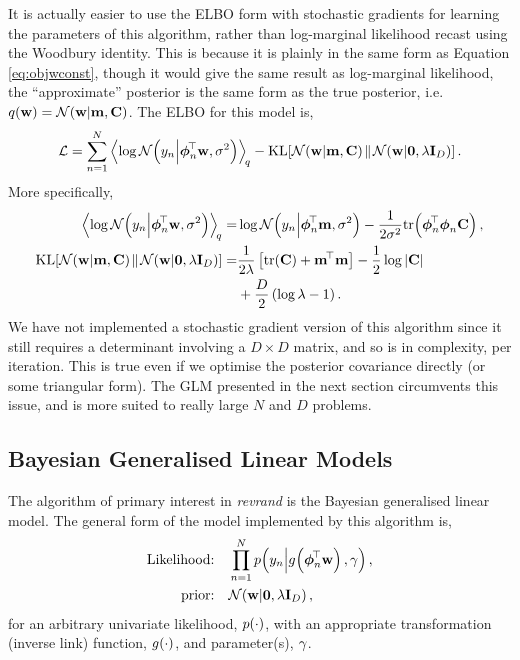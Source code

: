 \documentclass[11pt, oneside]{article}
\begin{document}
It is actually easier to use the ELBO form with stochastic gradients for
learning the parameters of this algorithm, rather than log-marginal likelihood
recast using the Woodbury identity.  This is because it is plainly in the same
form as Equation \eqref{eq:objwconst}, though it would give the same result as
log-marginal likelihood, the ``approximate'' posterior is the same form as the
true posterior, i.e.\ $q\!\left({\mathbf{w}}\right) = \mathcal{N}\!\left({\mathbf{w}}\middle\vert{\ensuremath{\mathbf{m}}, \ensuremath{\mathbf{C}}}\right)$.
The ELBO for this model is,
\begin{equation}
    \elbo = \sum^N_{n=1} 
    \expec{q}{\log\gausC{\targs_n}{\feats_n\T\weights, \var}}
    - \KL{\gausC{\weights}{\pomean, \pocov}}
        {\gausC{\weights}{\mathbf{0}, \reg\ident{D}}}.
    \label{eq:slmobj}
\end{equation}
More specifically,
\begin{align*}
    \expec{q}{\log\gausC{\targs_n}{\feats_n\T\weights, \var}} =&
    \log \gausC{\targs_n}{\feats_n\T\pomean, \var}
    - \frac{1}{2 \var} \trace{\feats_n\T\feats_n\pocov}, \\
    \KL{\gausC{\weights}{\pomean, \pocov}}
        {\gausC{\weights}{\mathbf{0}, \reg\ident{D}}} =&
        \frac{1}{2 \reg} \sbrac{\trace{\pocov} + \pomean\T\pomean} 
        - \frac{1}{2} \log\deter{\pocov} \\
        &+ \frac{D}{2} \brac{\log \reg - 1}.
\end{align*}
We have not implemented a stochastic gradient version of this algorithm since
it still requires a determinant involving a $D \times D$ matrix, and so is
 in complexity, per iteration. This is true even if we optimise the
posterior covariance directly (or some triangular form). The GLM presented in
the next section circumvents this issue, and is more suited to really large $N$
and $D$ problems.


\subsection{Bayesian Generalised Linear Models}

The algorithm of primary interest in \emph{revrand} is the Bayesian generalised
linear model. The general form of the model implemented by this algorithm is,
\begin{align}
    \text{Likelihood:} \quad &\prod^N_{n=1} 
        p\!\left({y_n}\middle\vert{\ensuremath{{g}_{}\!\left({{\boldsymbol\phi_n^{\!\top}\mathbf{w}}}\right)}, \ensuremath{\gamma}}\right), 
        \label{eq:glmlike} \\
    \text{prior:} \quad &\mathcal{N}\!\left({\mathbf{w}}\middle\vert{\mathbf{0}, \ensuremath{\lambda}\ensuremath{\mathbf{I}_{D}}}\right),
\end{align}
for an arbitrary univariate likelihood, $p\!\left({\cdot}\right)$, with an appropriate
transformation (inverse link) function, ${g}_{}\!\left({{\cdot}}\right)$, and parameter(s),
$\gamma$. 
\end{document}
